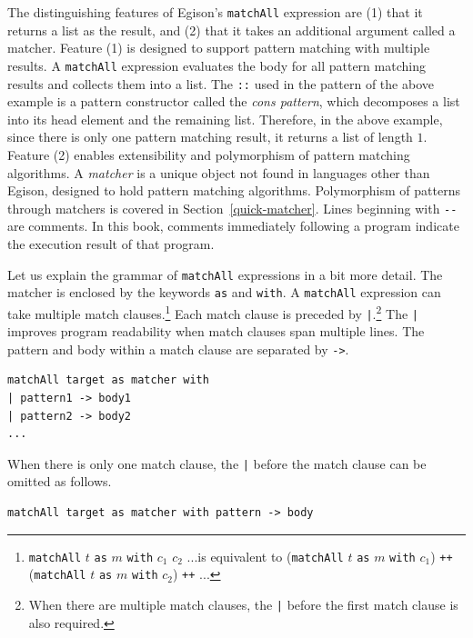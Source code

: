 The distinguishing features of Egison's \lstinline{matchAll} expression are (1) that it returns a list as the result, and (2) that it takes an additional argument called a matcher.
Feature (1) is designed to support pattern matching with multiple results.
A \lstinline{matchAll} expression evaluates the body for all pattern matching results and collects them into a list.
The \lstinline{::} used in the pattern of the above example is a pattern constructor called the \emph{cons pattern}, which decomposes a list into its head element and the remaining list.
Therefore, in the above example, since there is only one pattern matching result, it returns a list of length $1$.
Feature (2) enables extensibility and polymorphism of pattern matching algorithms.
A \emph{matcher} is a unique object not found in languages other than Egison, designed to hold pattern matching algorithms.
Polymorphism of patterns through matchers is covered in Section~\ref{quick-matcher}.
Lines beginning with \lstinline{--} are comments.
In this book, comments immediately following a program indicate the execution result of that program.

Let us explain the grammar of \lstinline{matchAll} expressions in a bit more detail.
The matcher is enclosed by the keywords \lstinline{as} and \lstinline{with}.
A \lstinline{matchAll} expression can take multiple match clauses.\footnote{\lstinline{matchAll} $t$ \lstinline{as} $m$ \lstinline{with} $c_1$ $c_2$ $...$is equivalent to (\lstinline{matchAll} $t$ \lstinline{as} $m$ \lstinline{with} $c_1$) \lstinline{++} (\lstinline{matchAll} $t$ \lstinline{as} $m$ \lstinline{with} $c_2$) \lstinline{++} $...$}
Each match clause is preceded by \lstinline{|}.\footnote{When there are multiple match clauses, the \lstinline{|} before the first match clause is also required.}
The \lstinline{|} improves program readability when match clauses span multiple lines.
The pattern and body within a match clause are separated by \lstinline{->}.
\begin{lstlisting}[language=egison,numbers=none]
matchAll target as matcher with
| pattern1 -> body1
| pattern2 -> body2
...
\end{lstlisting}
When there is only one match clause, the \lstinline{|} before the match clause can be omitted as follows.
\begin{lstlisting}[language=egison,numbers=none]
matchAll target as matcher with pattern -> body
\end{lstlisting}

